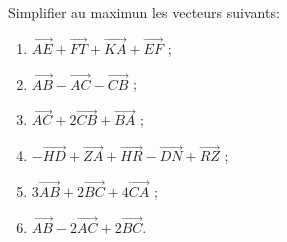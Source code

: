 \begin{exercice}
Simplifier au maximun les vecteurs suivants:
\begin{enumerate}
\item $\overrightarrow{AE}+\overrightarrow{FT}+\overrightarrow{KA}+\overrightarrow{EF}$ ;
\item $\overrightarrow{AB}-\overrightarrow{AC}-\overrightarrow{CB}$ ;
\item $\overrightarrow{AC}+2\overrightarrow{CB}+\overrightarrow{BA}$ ;
\item $-\overrightarrow{HD}+\overrightarrow{ZA}+\overrightarrow{HR}-\overrightarrow{DN}+\overrightarrow{RZ}$ ;
\item $3\overrightarrow{AB}+2\overrightarrow{BC}+4\overrightarrow{CA}$ ;
\item $\overrightarrow{AB}-2\overrightarrow{AC}+2\overrightarrow{BC}$.
\end{enumerate}
\end{exercice}






